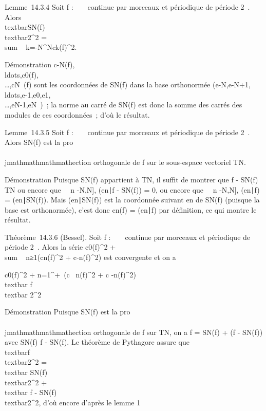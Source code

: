 Lemme~14.3.4 Soit f : ~ \rightarrow~  continue par morceaux et périodique de
période 2\pi~. Alors
\\textbar{}SN(f)\\textbar{}2^2
= \\sum ~
k=-N^N\textbar{}ck(f)\textbar{}^2.

Démonstration
c-N(f),\\ldots,c0(f),\\\ldots,cN~(f)
sont les coordonnées de SN(f) dans la base orthonormée
(e-N,e-N+1,\\ldots,e-1,e0,e1,\\\ldots,eN-1,eN~)~;
la norme au carré de SN(f) est donc la somme des carrés des
modules de ces coordonnées~; d'où le résultat.

Lemme~14.3.5 Soit f : ~ \rightarrow~  continue par morceaux et périodique de
période 2\pi~. Alors SN(f) est la pro\\\\jmathmathmathmathection orthogonale de f sur
le sous-espace vectoriel TN.

Démonstration Puisque SN(f) appartient à TN, il
suffit de montrer que f - SN(f) \bot TN ou encore que
\forall~~n \in {[}-N,N{]},
(en∣f - SN(f)) = 0, ou
encore que \forall~~n \in {[}-N,N{]},
(en∣f) =
(en∣SN(f)). Mais
(en∣SN(f)) est la
coordonnée suivant en de SN(f) (puisque la base est
orthonormée), c'est donc cn(f) =
(en∣f) par définition, ce qui
montre le résultat.

Théorème~14.3.6 (Bessel). Soit f : ~ \rightarrow~  continue par morceaux et
périodique de période 2\pi~. Alors la série
\textbar{}c0(f)\textbar{}^2
+ \\sum ~
n≥1(\textbar{}cn(f)\textbar{}^2 +
\textbar{}c-n(f)\textbar{}^2) est convergente et on
a

\textbar{}c0(f)\textbar{}^2 +
\sum n=1^+\infty~(\textbar{}c~
n(f)\textbar{}^2 + \textbar{}c
-n(f)\textbar{}^2) \leq\\textbar{}
f\\textbar{} 2^2

Démonstration Puisque SN(f) est la pro\\\\jmathmathmathmathection orthogonale de f
sur TN, on a f = SN(f) + (f - SN(f)) avec
SN(f) \bot f - SN(f). Le théorème de Pythagore assure
que
\\textbar{}f\\textbar{}2^2
=\\textbar{}
SN(f)\\textbar{}2^2
+\\textbar{} f -
SN(f)\\textbar{}2^2, d'où
encore d'après le lemme 1

